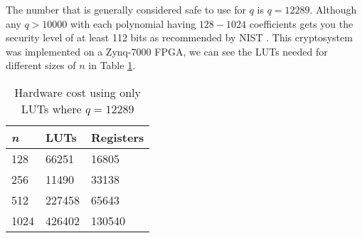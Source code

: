 The number that is generally considered safe to use for $q$ is $q = 12289$.
Although any $q > 10 000$ with each polynomial having $128 - 1024$ coefficients
gets you the security level of at least 112 bits as recommended by NIST
\citep{barker2006recommendation}. This cryptosystem was implemented on a
Zynq-7000 FPGA, we can see the LUTs needed for different sizes of $n$ in Table
\ref{tab:hardwarecost}.

\begin{table}[H]
    \centering
    \begin{tabular}{l|ll}
        \textit{n} & LUTs   & Registers \\ \hline
        128        & 66251  & 16805     \\
        256        & 11490  & 33138     \\
        512        & 227458 & 65643     \\
        1024       & 426402 & 130540
    \end{tabular}
    \caption{Hardware cost using only LUTs where $q = 12289$
    \citep{FPGA_Post_Quantum_Primitives}}
    \label{tab:hardwarecost}
\end{table}

